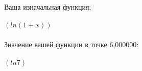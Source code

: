 \documentclass[12pt,a4paper]{scrartcl}
\begin{document}
\\\\Ваша изначальная функция: \\
\\{${(ln{({1}+{x})})}$}
\\\\Значение вашей функции в точке 6,000000: \\
\\{${(ln{7})}$}
\end{document}
